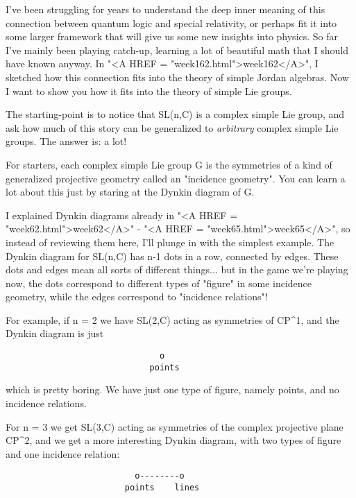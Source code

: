 I've been struggling for years to understand the deep inner meaning of
this connection between quantum logic and special relativity, or perhaps
fit it into some larger framework that will give us some new insights
into physics.    So far I've mainly been playing catch-up, learning a
lot of beautiful math that I should have known anyway.   In "<A HREF = "week162.html">week162</A>", 
I sketched how this connection fits into the theory of simple Jordan 
algebras.  Now I want to show you how it fits into the theory of simple 
Lie groups.  

The starting-point is to notice that SL(n,C) is a complex simple Lie
group, and ask how much of this story can be generalized to \emph{arbitrary}
complex simple Lie groups.  The answer is: a lot!

For starters, each complex simple Lie group G is the symmetries of a
kind of generalized projective geometry called an "incidence geometry".
You can learn a lot about this just by staring at the Dynkin diagram 
of G.

I explained Dynkin diagrams already in "<A HREF = "week62.html">week62</A>" - "<A HREF = "week65.html">week65</A>", so instead
of reviewing them here, I'll plunge in with the simplest example.  The 
Dynkin diagram for SL(n,C) has n-1 dots in a row, connected by edges. 
These dots and edges mean all sorts of different things... but in the
game we're playing now, the dots correspond to different types of
"figure" in some incidence geometry, while the edges correspond to 
"incidence relations"!   

For example, if n = 2 we have SL(2,C) acting as symmetries of CP^{1},
and the Dynkin diagram is just

\begin{verbatim}
                               o
                             points
\end{verbatim}
    
which is pretty boring.  We have just one type of figure, namely
points, and no incidence relations.
          
For n = 3 we get SL(3,C) acting as symmetries of the complex
projective plane CP^{2}, and we get a more interesting Dynkin
diagram, with two types of figure and one incidence relation:

\begin{verbatim}
                          o--------o
                        points    lines  
\end{verbatim}
    
